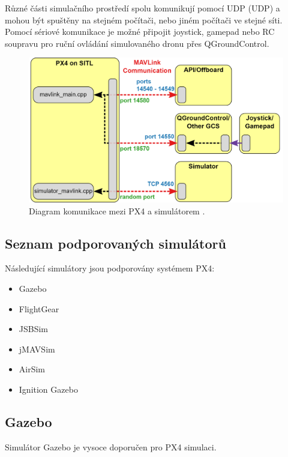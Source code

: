 Různé části simulačního prostředí spolu komunikují pomocí \acs{UDP} (\acl{UDP}) a mohou být spuštěny na stejném počítači, nebo jiném počítači ve stejné síti. Pomocí sériové komunikace je možné připojit joystick, gamepad nebo RC soupravu pro ruční ovládání simulovaného dronu přes QGroundControl.

\begin{figure}[!ht]
  \begin{center}
    \includegraphics[scale=0.3]{obrazky/SIM2}
  \end{center}
  \caption[Diagram komunikace mezi PX4 a simulátorem]{Diagram komunikace mezi PX4 a simulátorem \cite{SIM}.}
  \label{fig:SIM2}
\end{figure}

\subsection{Seznam podporovaných simulátorů}

Následující simulátory jsou podporovány systémem PX4:

\begin{itemize}
    \item Gazebo
    \item FlightGear
    \item JSBSim
    \item jMAVSim
    \item AirSim
    \item Ignition Gazebo
\end{itemize}

\subsection{Gazebo}

Simulátor Gazebo je vysoce doporučen pro PX4 simulaci.


